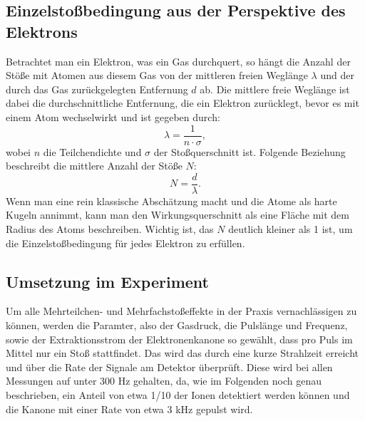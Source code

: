 \subsection{Einzelstoßbedingung aus der Perspektive des Elektrons}
Betrachtet man ein Elektron, was ein Gas durchquert, so hängt die Anzahl der Stöße mit Atomen aus diesem Gas von der mittleren freien Weglänge $\lambda$ und der durch das Gas zurückgelegten Entfernung $d$ ab. Die mittlere freie Weglänge ist dabei die durchschnittliche Entfernung, die ein Elektron zurücklegt, bevor es mit einem Atom wechselwirkt und ist gegeben durch:
\begin{equation}
    \lambda = \frac{1}{n \cdot \sigma},
\end{equation}
wobei $n$ die Teilchendichte und $\sigma$ der Stoßquerschnitt ist.
Folgende Beziehung beschreibt die mittlere Anzahl der Stöße $N$:
\begin{equation}
    N = \frac{d}{\lambda}.
\end{equation}
Wenn man eine rein klassische Abschätzung macht und die Atome als harte Kugeln annimmt, kann man den Wirkungsquerschnitt als eine Fläche mit dem Radius des Atoms beschreiben. Wichtig ist, das $N$ deutlich kleiner als 1 ist, um die Einzelstoßbedingung für jedes Elektron zu erfüllen. 

\subsection{Umsetzung im Experiment}
Um alle Mehrteilchen- und Mehrfachstoßeffekte in der Praxis vernachlässigen zu können, werden die Paramter, also der Gasdruck, die Pulslänge und Frequenz, sowie der Extraktionsstrom der Elektronenkanone so gewählt, dass pro Puls im Mittel nur ein Stoß stattfindet. Das wird das durch eine kurze Strahlzeit erreicht und über die Rate der Signale am Detektor überprüft. Diese wird bei allen Messungen auf unter 300 Hz gehalten, da, wie im Folgenden noch genau beschrieben, ein Anteil von etwa 1/10 der Ionen detektiert werden können und die Kanone mit einer Rate von etwa 3 kHz gepulst wird.